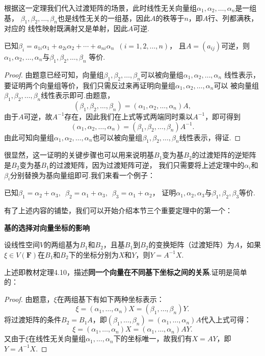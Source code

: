根据这一定理我们代入过渡矩阵的场景，此时线性无关向量组$\alpha_1,\alpha_2,\ldots,\alpha_n$是一组基，
$\beta_1,\beta_2,\ldots,\beta_n$也是线性无关的一组基，因此$A$的秩等于$n$，即$A$行、列都满秩，对应的
线性映射既满射又是单射，因此$A$可逆.
\begin{theorem}
    已知$\beta_i=a_{1i}\alpha_1+a_{2i}\alpha_2+\cdots+a_{ni}\alpha_n\enspace(i=1,2,\ldots,n)$，
    且$A=(a_{ij})$可逆，则$\alpha_1,\alpha_2,\ldots,\alpha_n$与$\beta_1,\beta_2,\ldots,\beta_n$
    等价.
\end{theorem}
\begin{proof}
    由题意已经可知，向量组$\beta_1,\beta_2,\ldots,\beta_n$可以被向量组$\alpha_1,\alpha_2,\ldots,\alpha_n$
    线性表示，要证明两个向量组等价，我们只需反过来再证明向量组$\alpha_1,\alpha_2,\ldots,\alpha_n$可以
    被向量组$\beta_1,\beta_2,\ldots,\beta_n$线性表示即可.由题意，
    \[(\beta_1,\beta_2,\ldots,\beta_n)=(\alpha_1,\alpha_2,\ldots,\alpha_n)A,\]
    由于$A$可逆，故$A^{-1}$存在，因此我们在上式等式两端同时乘以$A^{-1}$，即可得到
    \[(\alpha_1,\alpha_2,\ldots,\alpha_n)=(\beta_1,\beta_2,\ldots,\beta_n)A^{-1}.\]
    由此可知向量组$\alpha_1,\alpha_2,\ldots,\alpha_n$也可以被向量组$\beta_1,\beta_2,\ldots,\beta_n$线性表示，得证.
\end{proof}

很显然，这一证明的关键步骤也可以用来说明基$B_1$变为基$B_2$的过渡矩阵的逆矩阵是$B_2$变为基$B_1$的过渡矩阵，因为过渡矩阵可逆，
我们只需要将上述定理中的$\alpha_i$和$\beta_i$分别替换为基向量组即可.我们来看一个例子：
\begin{example}
    已知$\beta_1=\alpha_2+\alpha_3,\enspace\beta_2=\alpha_1+\alpha_3,\enspace\beta_3=\alpha_1+\alpha_2$，
    证明$\alpha_1,\alpha_2,\alpha_3$与$\beta_1,\beta_2,\beta_3$等价.
\end{example}
\begin{solution}

\end{solution}

有了上述内容的铺垫，我们可以开始介绍本节三个重要定理中的第一个：
\begin{theorem}
    \textbf{\heiti 基的选择对向量坐标的影响}

    设线性空间$V$的两组基为$B_1$和$B_2$，且基$B_1$到$B_2$的变换矩阵（过渡矩阵）为$A$，如果
    $\xi \in V(\mathbf{F})$在$B_1$和$B_2$下的坐标分别为$X$和$Y$，则$Y=A^{-1}X$.
\end{theorem}
上述即教材定理4.10，描述\textbf{同一个向量在不同基下坐标之间的关系}.证明是简单的：

\begin{proof}
    由题意，$\xi$在两组基下有如下两种坐标表示：
    \[\xi=(\alpha_1,\ldots,\alpha_n)X=(\beta_1,\ldots,\beta_n)Y.\]
    将过渡矩阵的条件$B_2=B_1A$，即$(\beta_1,\ldots,\beta_n)=(\alpha_1,\ldots,\alpha_n)A$代入上式可得：
    \[\xi=(\alpha_1,\ldots,\alpha_n)X=(\alpha_1,\ldots,\alpha_n)AY.\]
    又由于$\xi$在线性无关向量组$\alpha_1,\ldots,\alpha_n$下的坐标唯一，故我们有$X=AY$，即$Y=A^{-1}X$.
\end{proof}

